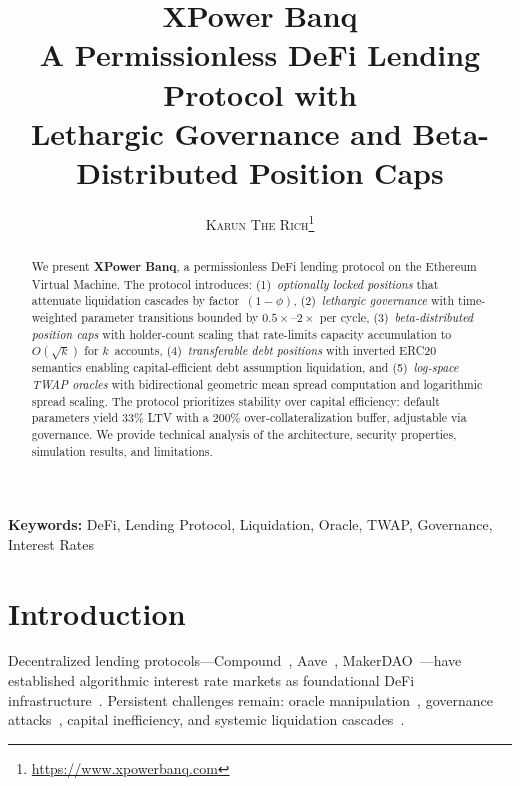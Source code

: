 \documentclass[10pt,a4paper,twocolumn]{article}
\title{\textbf{\Huge XPower Banq}\\[0.5em]
\Large A Permissionless DeFi Lending Protocol with\\Lethargic Governance and Beta-Distributed Position Caps}
\author{
    \textsc{Karun The Rich}\thanks{\url{https://www.xpowerbanq.com}}
}
\date{}
\theoremstyle{definition}
\theoremstyle{plain}
\theoremstyle{remark}
\begin{document}
\maketitle


\begin{abstract}
We present \textbf{XPower Banq}, a permissionless DeFi lending protocol on the Ethereum Virtual Machine. The protocol introduces: (1)~\emph{optionally locked positions} that attenuate liquidation cascades by factor~$(1{-}\phi)$, (2)~\emph{lethargic governance} with time-weighted parameter transitions bounded by $0.5\times$--$2\times$ per cycle, (3)~\emph{beta-distributed position caps} with holder-count scaling that rate-limits capacity accumulation to $O(\sqrt{k})$ for $k$~accounts, (4)~\emph{transferable debt positions} with inverted ERC20 semantics enabling capital-efficient debt assumption liquidation, and (5)~\emph{log-space TWAP oracles} with bidirectional geometric mean spread computation and logarithmic spread scaling. The protocol prioritizes stability over capital efficiency: default parameters yield 33\% LTV with a 200\% over-collateralization buffer, adjustable via governance. We provide technical analysis of the architecture, security properties, simulation results, and limitations.
\end{abstract}

\textbf{Keywords:} DeFi, Lending Protocol, Liquidation, Oracle, TWAP, Governance, Interest Rates

\section{Introduction}
\label{sec:introduction}

Decentralized lending protocols---Compound~\cite{compound2019}, Aave~\cite{aave2020}, MakerDAO~\cite{makerdao2017}---have established algorithmic interest rate markets as foundational DeFi infrastructure~\cite{bartoletti2021}. Persistent challenges remain: oracle manipulation~\cite{mackinga2022}, governance attacks~\cite{beanstalk2022}, capital inefficiency, and systemic liquidation cascades~\cite{gudgeon2020}.
\end{document}

